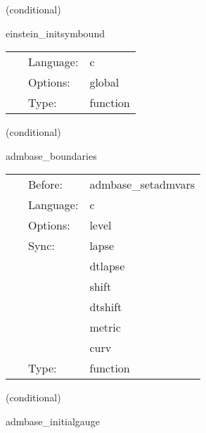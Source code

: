 \vspace{5mm}

   (conditional) 

\hspace{5mm} einstein\_initsymbound 

\hspace{5mm}{\it set up gf symmetries } 


\hspace{5mm}

 \begin{tabular*}{160mm}{cll} 
~ & Language:  & c \\ 
~ & Options:  & global \\ 
~ & Type:  & function \\ 
\end{tabular*} 


\vspace{5mm}

   (conditional) 

\hspace{5mm} admbase\_boundaries 

\hspace{5mm}{\it select admbase boundary conditions - may be required for mesh refinement } 


\hspace{5mm}

 \begin{tabular*}{160mm}{cll} 
~ & Before:  & admbase\_setadmvars \\ 
~ & Language:  & c \\ 
~ & Options:  & level \\ 
~ & Sync:  & lapse \\ 
~& ~ &dtlapse\\ 
~& ~ &shift\\ 
~& ~ &dtshift\\ 
~& ~ &metric\\ 
~& ~ &curv\\ 
~ & Type:  & function \\ 
\end{tabular*} 


\vspace{5mm}

   (conditional) 

\hspace{5mm} admbase\_initialgauge 

\hspace{5mm}{\it schedule group for the adm initial gauge condition } 



